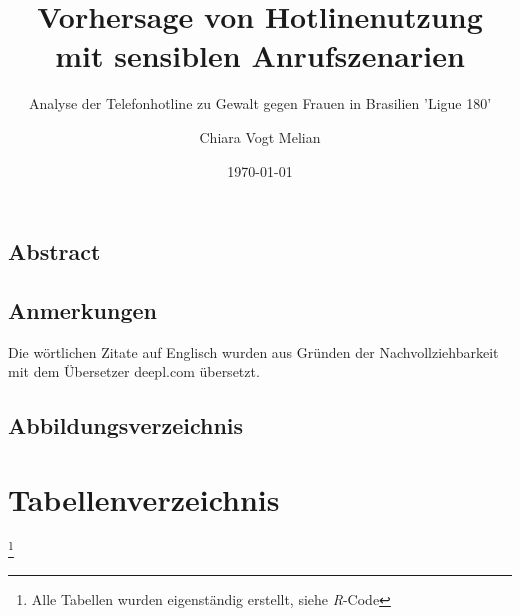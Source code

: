 \documentclass[12pt]{report}
\title{Vorhersage von Hotlinenutzung mit sensiblen Anrufszenarien}
\subtitle{Analyse der Telefonhotline zu Gewalt gegen Frauen in Brasilien 'Ligue 180'}
\author{Chiara Vogt Melian}
\date{\today}
\begin{document}
	\maketitle
	\thispagestyle{empty}
	\newpage
	\setcounter{page}{2}
	\begin{spacing}{1}
		\chapter*{Abstract} 
		\renewcommand{\abstract}{}
		\abstract
	\end{spacing}
	\begin{spacing}{1}
		\chapter*{Anmerkungen} 
		Die wörtlichen Zitate auf Englisch wurden aus Gründen der Nachvollziehbarkeit mit dem Übersetzer deepl.com übersetzt. 	
	\end{spacing}
	\newpage
	\begin{spacing}{1}
		
		\tableofcontents
	\end{spacing}
	\newpage
	
	\begin{spacing}{1}
		\chapter*{Abbildungsverzeichnis} 
		\renewcommand{\listfigurename}{}
		\listoffigures
	\end{spacing}
	\newpage
	\chapter*{Tabellenverzeichnis} 
	\renewcommand{\listtablename}{}
	\listoftables %
	\footnote{Alle Tabellen wurden eigenständig erstellt, siehe \emph{R}-Code}  %
	\newpage
\end{document}
